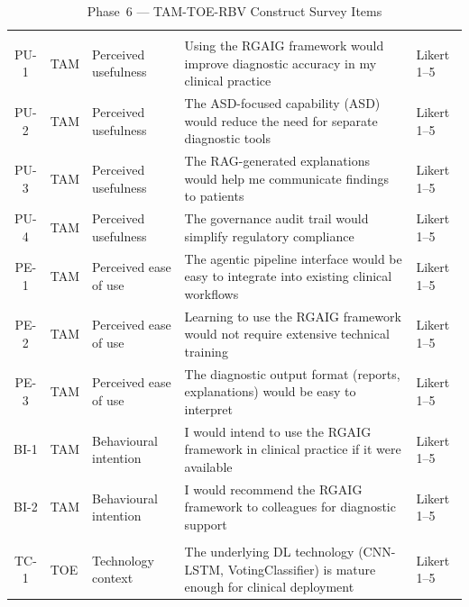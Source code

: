 \begin{xltabular}{\textwidth}{@{} c l l X l @{}}
\caption{Phase~6 --- TAM-TOE-RBV Construct Survey Items}
\label{tab:phase6_tam_survey}\\
\toprule
{} &  &  &  &  \\
\midrule
\endfirsthead
\endhead
\bottomrule
\endlastfoot
{} \\
\midrule
PU-1  & TAM & Perceived usefulness  & Using the RGAIG framework would improve diagnostic accuracy in my clinical practice & Likert 1--5 \\
\addlinespace
PU-2  & TAM & Perceived usefulness  & The ASD-focused capability (ASD) would reduce the need for separate diagnostic tools & Likert 1--5 \\
\addlinespace
PU-3  & TAM & Perceived usefulness  & The RAG-generated explanations would help me communicate findings to patients & Likert 1--5 \\
\addlinespace
PU-4  & TAM & Perceived usefulness  & The governance audit trail would simplify regulatory compliance & Likert 1--5 \\
\addlinespace
PE-1  & TAM & Perceived ease of use & The agentic pipeline interface would be easy to integrate into existing clinical workflows & Likert 1--5 \\
\addlinespace
PE-2  & TAM & Perceived ease of use & Learning to use the RGAIG framework would not require extensive technical training & Likert 1--5 \\
\addlinespace
PE-3  & TAM & Perceived ease of use & The diagnostic output format (reports, explanations) would be easy to interpret & Likert 1--5 \\
\addlinespace
BI-1  & TAM & Behavioural intention & I would intend to use the RGAIG framework in clinical practice if it were available & Likert 1--5 \\
\addlinespace
BI-2  & TAM & Behavioural intention & I would recommend the RGAIG framework to colleagues for diagnostic support & Likert 1--5 \\
\addlinespace
\midrule
{} \\
\midrule
TC-1  & TOE & Technology context    & The underlying DL technology (CNN-LSTM, VotingClassifier) is mature enough for clinical deployment & Likert 1--5 \\

\end{xltabular}
